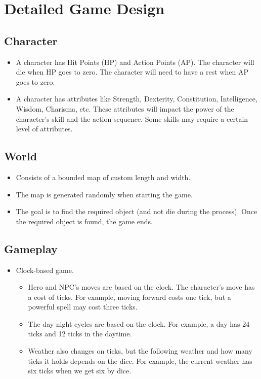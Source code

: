 \documentclass[10pt]{article}
\begin{document}
\section{Detailed Game Design}


\subsection{Character}

\begin{itemize}
\item A character has Hit Points (HP) and Action Points (AP). The character will die when HP goes to zero. The character will need to have a rest when AP goes to zero.
\item A character has attributes like Strength, Dexterity, Constitution, Intelligence, Wisdom, Charisma, etc. These attributes will impact the power of the character’s skill and the action sequence. Some skills may require a certain level of attributes.
\end{itemize}


\subsection{World}

\begin{itemize}
\item Consists of a bounded map of custom length and width.
\item The map is generated randomly when starting the game.
\item The goal is to find the required object (and not die during the process). Once the required object is found, the game ends.
\end{itemize}


\subsection{Gameplay}

\begin{itemize}
\item Clock-based game. 
    \begin{itemize}
    \item Hero and NPC’s moves are based on the clock. The character’s move has a cost of ticks. For example, moving forward costs one tick, but a powerful spell may cost three ticks.
    \item The day-night cycles are based on the clock. For example, a day has 24 ticks and 12 ticks in the daytime.
    \item Weather also changes on ticks, but the following weather and how many ticks it holds depends on the dice. For example, the current weather has six ticks when we get six by dice.
    \end{itemize}
\end{itemize}
\end{document}
